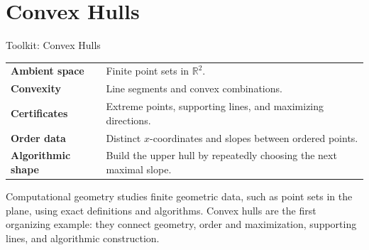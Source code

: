 
\section{Convex Hulls}

\begin{toolkitbox}{Toolkit: Convex Hulls}
\begin{tabular}{@{}p{}p{}@{}}
\textbf{Ambient space} & Finite point sets in \(\mathbb{R}^2\). \\[4pt]
\textbf{Convexity} & Line segments and convex combinations. \\[4pt]
\textbf{Certificates} & Extreme points, supporting lines, and maximizing directions. \\[4pt]
\textbf{Order data} & Distinct \(x\)-coordinates and slopes between ordered points. \\[4pt]
\textbf{Algorithmic shape} & Build the upper hull by repeatedly choosing the next maximal slope. \\
\end{tabular}
\end{toolkitbox}

\begin{remark*}[Exposition]
Computational geometry studies finite geometric data, such as point sets in
the plane, using exact definitions and algorithms. Convex hulls are the first
organizing example: they connect geometry, order and maximization, supporting
lines, and algorithmic construction.
\end{remark*}


